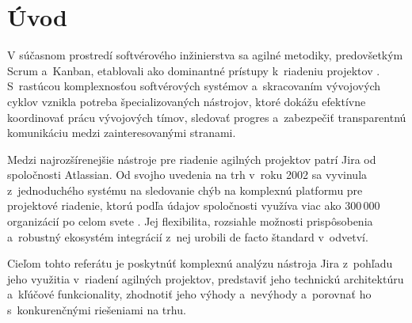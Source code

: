
\chapter{Úvod}\label{ch:introduction}

V súčasnom prostredí softvérového inžinierstva sa agilné metodiky, predovšetkým Scrum a~Kanban, etablovali ako dominantné prístupy k~riadeniu projektov \cite{scrumguide2020}. S~rastúcou komplexnosťou softvérových systémov a~skracovaním vývojových cyklov vznikla potreba špecializovaných nástrojov, ktoré dokážu efektívne koordinovať prácu vývojových tímov, sledovať progres a~zabezpečiť transparentnú komunikáciu medzi zainteresovanými stranami.

Medzi najrozšírenejšie nástroje pre riadenie agilných projektov patrí Jira od spoločnosti Atlassian. Od svojho uvedenia na trh v~roku 2002 sa vyvinula z~jednoduchého systému na sledovanie chýb na komplexnú platformu pre projektové riadenie, ktorú podľa údajov spoločnosti využíva viac ako 300\,000 organizácií po celom svete \cite{atlassian2024}. Jej flexibilita, rozsiahle možnosti prispôsobenia a~robustný ekosystém integrácií z~nej urobili de facto štandard v~odvetví.

Cieľom tohto referátu je poskytnúť komplexnú analýzu nástroja Jira z~pohľadu jeho využitia v~riadení agilných projektov, predstaviť jeho technickú architektúru a~kľúčové funkcionality, zhodnotiť jeho výhody a~nevýhody a~porovnať ho s~konkurenčnými riešeniami na trhu.
